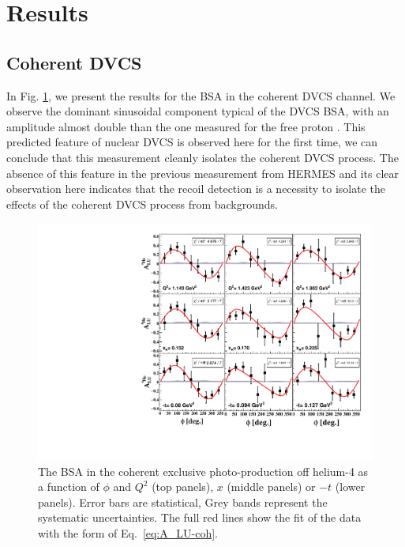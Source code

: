 \documentclass[aps,prc,preprint,superscriptaddress]{revtex4}
\begin{document}
\section{Results}

\subsection{Coherent DVCS}

In Fig. \ref{fig:CohALUphi}, we present the results for the BSA in the coherent DVCS channel. We 
observe the dominant sinusoidal component typical of the DVCS BSA, with an amplitude almost 
double than the one measured for the free proton \cite{Jo:2015ema}. This 
predicted feature of nuclear DVCS \cite{Guzey:2003jh} is observed here for the first time, we
can conclude that this measurement cleanly isolates the coherent DVCS process. The absence of 
this feature in the previous measurement from HERMES \cite{Airapetian:2009cga} and its clear observation here indicates that the recoil 
detection is a necessity to isolate the effects of the coherent DVCS process from backgrounds. 

\begin{figure}[bp!]
\center
\includegraphics[width=12cm]{fig3/Coherent_ALU_phi.pdf}
	\caption{The BSA in the coherent exclusive photo-production off helium-4 as a 
	function of $\phi$ and $Q^2$ 
	(top panels), $x$ (middle panels) or $-t$ (lower panels). Error bars are  
	statistical, Grey bands represent the systematic uncertainties. The full red lines show
	the fit of the data with the form of Eq.~\ref{eq:A_LU-coh}.}
\label{fig:CohALUphi}
\end{figure}
\end{document}
